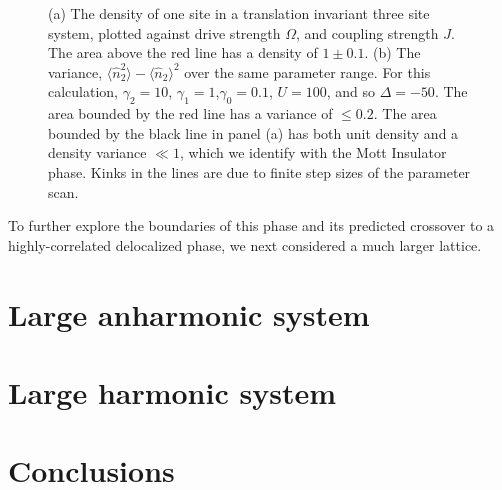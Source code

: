\begin{figure}[ht]
	 \hfill
	\caption{\label{fig:dnlca3-1} (a) The density of one site in a translation invariant three site system, plotted against drive strength \(\Omega\), and coupling strength \(J\). The area above the red line has a density of \(1 \pm 0.1\). (b) The variance, \(\langle \hat{n}_{2}^{2} \rangle - \langle \hat{n}_{2} \rangle^{2}\) over the same parameter range. For this calculation, \(\gamma_{2} = 10\), \(\gamma_{1} = 1\),\(\gamma_{0} = 0.1\), \(U=100\), and so \(\Delta = -50\). The area bounded by the red line has a variance of \(\leq 0.2\). The area bounded by the black line in panel (a) has both unit density and a density variance \(\ll 1\), which we identify with the Mott Insulator phase. Kinks in the lines are due to finite step sizes of the parameter scan.}
\end{figure}

To further explore the boundaries of this phase and its predicted crossover to a highly-correlated delocalized phase, we next considered a much larger lattice.

\section{Large anharmonic system}



\section{Large harmonic system}

\section{Conclusions}
